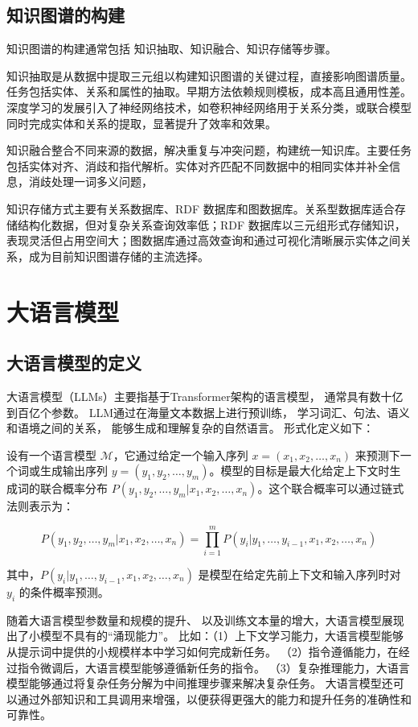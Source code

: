 \subsection{知识图谱的构建}

知识图谱的构建通常包括
知识抽取、知识融合、知识存储等步骤。

知识抽取是从数据中提取三元组以构建知识图谱的关键过程，直接影响图谱质量。任务包括实体、关系和属性的抽取。早期方法依赖规则模板，成本高且通用性差。深度学习的发展引入了神经网络技术，如卷积神经网络用于关系分类，或联合模型同时完成实体和关系的提取，显著提升了效率和效果。

知识融合整合不同来源的数据，解决重复与冲突问题，构建统一知识库。主要任务包括实体对齐、消歧和指代解析。实体对齐匹配不同数据中的相同实体并补全信息，消歧处理一词多义问题，

知识存储方式主要有关系数据库、RDF 数据库和图数据库。关系型数据库适合存储结构化数据，但对复杂关系查询效率低；RDF 数据库以三元组形式存储知识，表现灵活但占用空间大；图数据库通过高效查询和通过可视化清晰展示实体之间关系，成为目前知识图谱存储的主流选择。

\section{大语言模型}

\subsection{大语言模型的定义}

大语言模型（LLMs）主要指基于Transformer架构的语言模型，
通常具有数十亿到百亿个参数。
LLM通过在海量文本数据上进行预训练，
学习词汇、句法、语义和语境之间的关系，
能够生成和理解复杂的自然语言。
形式化定义如下：

设有一个语言模型 \( \mathcal{M} \)，它通过给定一个输入序列 \( x = (x_1, x_2, \dots, x_n) \) 来预测下一个词或生成输出序列 \( y = (y_1, y_2, \dots, y_m) \)。模型的目标是最大化给定上下文时生成词的联合概率分布 \( P(y_1, y_2, \dots, y_m | x_1, x_2, \dots, x_n) \)。这个联合概率可以通过链式法则表示为：

\[
P(y_1, y_2, \dots, y_m | x_1, x_2, \dots, x_n) = \prod_{i=1}^{m} P(y_i | y_1, \dots, y_{i-1}, x_1, x_2, \dots, x_n)
\]

其中，\( P(y_i | y_1, \dots, y_{i-1}, x_1, x_2, \dots, x_n) \) 是模型在给定先前上下文和输入序列时对 \( y_i \) 的条件概率预测。

随着大语言模型参数量和规模的提升、
以及训练文本量的增大，大语言模型展现出了小模型不具有的“涌现能力”。
比如：（1）上下文学习能力，大语言模型能够从提示词中提供的小规模样本中学习如何完成新任务。
（2）指令遵循能力，在经过指令微调后，大语言模型能够遵循新任务的指令。
（3）复杂推理能力，大语言模型能够通过将复杂任务分解为中间推理步骤来解决复杂任务。
大语言模型还可以通过外部知识和工具调用来增强，以便获得更强大的能力和提升任务的准确性和可靠性。

